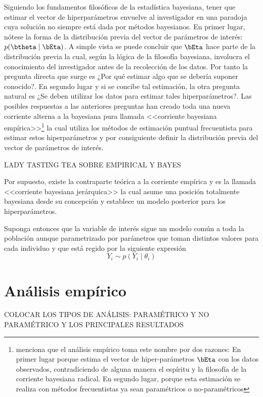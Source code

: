 Siguiendo los fundamentos filosóficos de la estadística bayesiana, tener que estimar el vector de hiperparámetros envuelve al investigador en una paradoja cuya solución no siempre está dada por métodos bayesianos. En primer lugar, nótese la forma de la distribución previa del vector de parámetros de interés: $p(\btheta \mid \bEta)$. A simple vista se puede concluir que $\bEta$ hace parte de la distribución previa la cual, según la lógica de la filosofía bayesiana, involucra el conocimiento del investigador antes de la recolección de los datos. Por tanto la pregunta directa que surge es ¿Por qué estimar algo que se debería suponer conocido?. En segundo lugar y si se concibe tal estimación, la otra pregunta natural es ¿Se deben utilizar los datos para estimar tales hiperparámetros?. Las posibles respuestas a las anteriores preguntas han creado toda una nueva corriente alterna a la bayesiana pura llamada <<corriente bayesiana empírica>>\footnote{ menciona que el análisis empírico toma este nombre por dos razones: En primer lugar porque estima el vector de hiper-parámetros $\bEta$ con los datos observados, contradiciendo de alguna manera el espíritu y la filosofía de la corriente bayesiana radical. En segundo lugar, porque esta estimación se realiza con métodos frecuentistas ya sean paramétricos o no-paramétricos} la cual utiliza los métodos de estimación puntual frecuentista para estimar estos hiperparámetros y por consiguiente definir la distribución previa del vector de parámetros de interés.

LADY TASTING TEA SOBRE EMPIRICAL Y BAYES

Por supuesto, existe la contraparte teórica a la corriente empírica y es la llamada <<corriente bayesiana jerárquica>> la cual asume una posición totalmente bayesiana desde su concepción y establece un modelo posterior para los hiperparámetros.

Suponga entonces que la variable de interés sigue un modelo común a toda la población aunque parametrizado por parámetros que toman distintos valores para cada individuo y que está regido por la siguiente expresión
\begin{equation*}
Y_i\sim p(Y_i \mid \theta_i)
\end{equation*}

\section{Análisis empírico}

COLOCAR LOS TIPOS DE ANÁLISIS: PARAMÉTRICO Y NO PARAMÉTRICO Y LOS PRINCIPALES RESULTADOS

